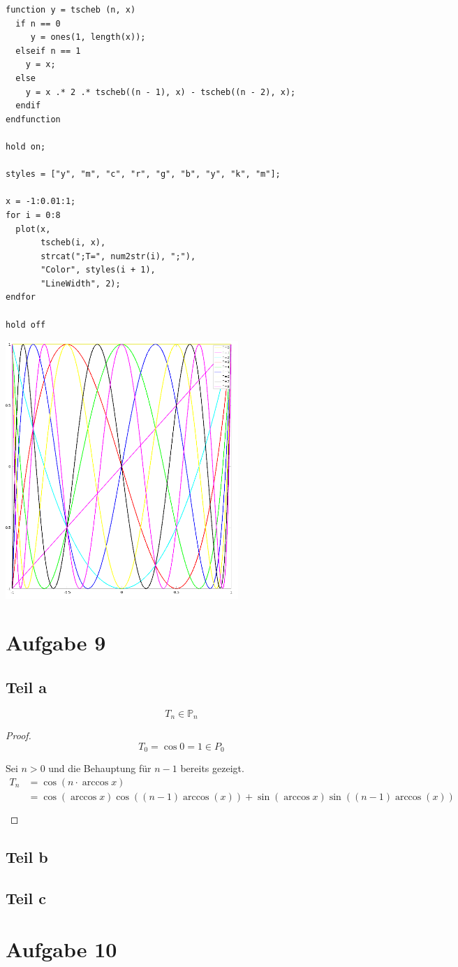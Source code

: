 \documentclass[10pt,a4paper]{article}
\begin{document}
\begin{lstlisting}
function y = tscheb (n, x)
  if n == 0
     y = ones(1, length(x));
  elseif n == 1
    y = x;
  else
    y = x .* 2 .* tscheb((n - 1), x) - tscheb((n - 2), x);
  endif
endfunction

hold on;

styles = ["y", "m", "c", "r", "g", "b", "y", "k", "m"];

x = -1:0.01:1;
for i = 0:8
  plot(x,
       tscheb(i, x),
       strcat(";T=", num2str(i), ";"),
       "Color", styles(i + 1),
       "LineWidth", 2);
endfor

hold off
\end{lstlisting}

\includegraphics[width=250pt]{3_8.png}

\section{Aufgabe 9}

\subsection{Teil a}

\begin{equation}
  T_{n} \in \mathbb{P}_{n}
\end{equation}

\begin{proof}
  \begin{equation}
    T_{0} = \cos 0 = 1 \in P_{0}
  \end{equation}

  Sei $n > 0$ und die Behauptung für $n - 1$ bereits gezeigt.
  \begin{align*}
    T_{n} & = \cos(n \cdot \arccos x)\\
    & = \cos(\arccos x)\cos((n - 1)\arccos(x)) + \sin(\arccos x)\sin((n - 1)\arccos(x))\\^{}
  \end{align*}
\end{proof}

\subsection{Teil b}

\subsection{Teil c}

\section{Aufgabe 10}
\end{document}
